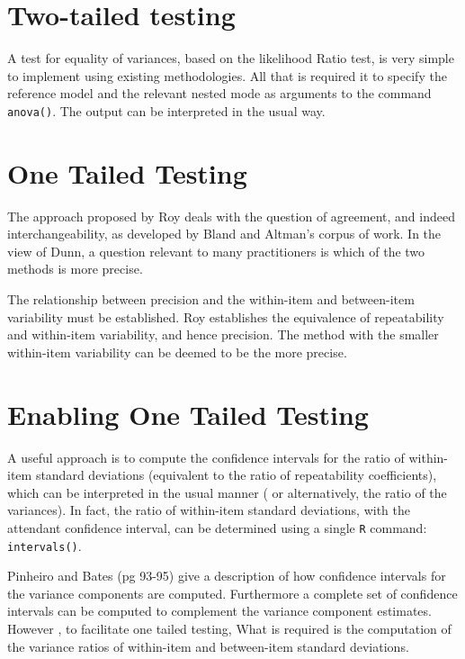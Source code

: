 \documentclass[12pt, a4paper]{report}
\theoremstyle{plain}
\theoremstyle{definition}
\theoremstyle{remark}
\begin{document}
	
	
	
	

	\section{Two-tailed testing} A test for equality of variances, based on the likelihood Ratio test, is very simple to implement using existing methodologies. All that is required it to specify the reference model and the relevant nested mode as arguments to the command \texttt{anova()}. The output can be interpreted in the usual way.
	
	\section{One Tailed Testing}
	The approach proposed by Roy deals with the question of agreement, and indeed interchangeability, as developed by Bland and Altman's corpus of work. In the view of Dunn, a question relevant to many practitioners is which of the two methods is more precise.
	
	The relationship between precision and the within-item and between-item variability must be established. Roy establishes the equivalence of repeatability and within-item variability, and hence precision.  The method with the smaller within-item variability can be deemed to be the more precise.
	
	\section{Enabling One Tailed Testing}
	A useful approach is to compute the confidence intervals for the ratio of within-item standard deviations (equivalent to the ratio of repeatability coefficients), which can be interpreted in the usual manner ( or alternatively, the ratio of the variances). In fact, the ratio of within-item standard deviations, with the attendant confidence interval,  can be determined using a single \texttt{R} command: \texttt{intervals()}.
	
	Pinheiro and Bates (pg 93-95) give a description of how confidence intervals for the variance components are computed. Furthermore a complete set of confidence intervals can be computed to complement the variance component estimates.
	However , to facilitate one tailed testing, What is required is the computation of the variance ratios of within-item and between-item standard deviations.
	
\end{document}
